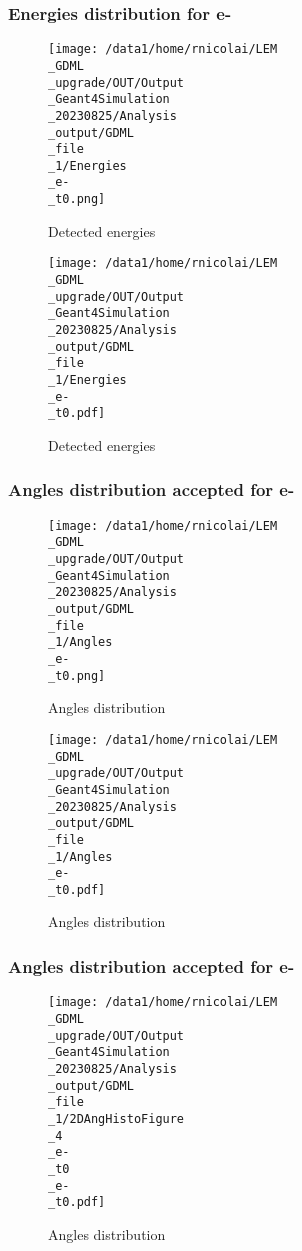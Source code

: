 \documentclass[8pt]{beamer}
\begin{document}
            \begin{frame}
                \frametitle{Energies distribution for e-}
            
        \begin{figure}[h]
            \centering
            \texttt{[image: /data1/home/rnicolai/LEM\\\_GDML\\\_upgrade/OUT/Output\\\_Geant4Simulation\\\_20230825/Analysis\\\_output/GDML\\\_file\\\_1/Energies\\\_e-\\\_t0.png]}
            \caption{Detected energies}
        \end{figure}
        
        \begin{figure}[h]
            \centering
            \texttt{[image: /data1/home/rnicolai/LEM\\\_GDML\\\_upgrade/OUT/Output\\\_Geant4Simulation\\\_20230825/Analysis\\\_output/GDML\\\_file\\\_1/Energies\\\_e-\\\_t0.pdf]}
            \caption{Detected energies}
        \end{figure}
        
            \end{frame}
            
            \begin{frame}
                \frametitle{Angles distribution accepted for e-}
            
        \begin{figure}[h]
            \centering
            \texttt{[image: /data1/home/rnicolai/LEM\\\_GDML\\\_upgrade/OUT/Output\\\_Geant4Simulation\\\_20230825/Analysis\\\_output/GDML\\\_file\\\_1/Angles\\\_e-\\\_t0.png]}
            \caption{Angles distribution}
        \end{figure}
        
        \begin{figure}[h]
            \centering
            \texttt{[image: /data1/home/rnicolai/LEM\\\_GDML\\\_upgrade/OUT/Output\\\_Geant4Simulation\\\_20230825/Analysis\\\_output/GDML\\\_file\\\_1/Angles\\\_e-\\\_t0.pdf]}
            \caption{Angles distribution}
        \end{figure}
        
            \end{frame}
            
            \begin{frame}
                \frametitle{Angles distribution accepted for e-}
            
        \begin{figure}[h]
            \centering
            \texttt{[image: /data1/home/rnicolai/LEM\\\_GDML\\\_upgrade/OUT/Output\\\_Geant4Simulation\\\_20230825/Analysis\\\_output/GDML\\\_file\\\_1/2DAngHistoFigure\\\_4\\\_e-\\\_t0\\\_e-\\\_t0.pdf]}
            \caption{Angles distribution}
        \end{figure}
        
            \end{frame}
            
\end{document}
